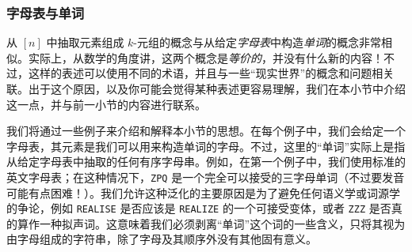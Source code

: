 \subsubsection*{字母表与单词}

从 $[n]$ 中抽取元素组成 $k$-元组的概念与从给定\emph{字母表}中构造\emph{单词}的概念非常相似。实际上，从数学的角度讲，这两个概念是\emph{等价的}，并没有什么新的内容！不过，这样的表述可以使用不同的术语，并且与一些``现实世界''的概念和问题相关联。出于这个原因，以及你可能会觉得某种表述更容易理解，我们在本小节中介绍这一点，并与前一小节的内容进行联系。

我们将通过一些例子来介绍和解释本小节的思想。在每个例子中，我们会给定一个字母表，其元素是我们可以用来构造单词的字母。不过，这里的``单词''实际上是指从给定字母表中抽取的任何有序字母串。例如，在第一个例子中，我们使用标准的英文字母表；在这种情况下，\verb|ZPQ| 是一个完全可以接受的三字母单词（不过要发音可能有点困难！）。我们允许这种泛化的主要原因是为了避免任何语义学或词源学的争论，例如 \verb|REALISE| 是否应该是 \verb|REALIZE| 的一个可接受变体，或者 \verb|ZZZ| 是否真的算作一种拟声词。这意味着我们必须剥离``单词''这个词的一些含义，只将其视为由字母组成的字符串，除了字母及其顺序外没有其他固有意义。\\

